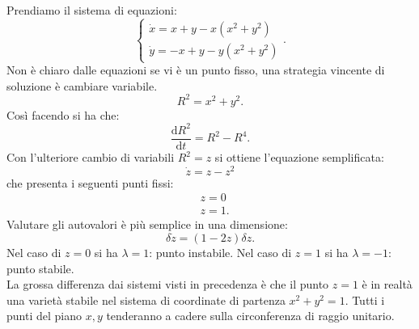 \noindent
\begin{exmp}
    Prendiamo il sistema di equazioni:
    \[
        \begin{cases}
	    \dot{x} = x + y - x (x^2+y^2) \\
	    \dot{y}=- x + y - y(x^2+ y^2) 
        \end{cases}
    .\] 
    Non è chiaro dalle equazioni se vi è un punto fisso, una strategia vincente di soluzione è cambiare variabile.
    \[
        R^2=x^2+y^2
    .\] 
    Così facendo si ha che:
    \[
        \frac{\text{d} R^2}{\text{d} t} = R^2-R^4
    .\] 
    Con l'ulteriore cambio di variabili $R^2 = z$ si ottiene l'equazione semplificata:
    \[
        \dot{z}=z-z^2
    \] 
    che presenta i seguenti punti fissi:
    \[\begin{aligned}
	& z = 0\\
	& z = 1
    .\end{aligned}\] 
    Valutare gli autovalori è più semplice in una dimensione:
    \[
	\delta\dot{z}=(1-2z) \delta z
    .\] 
    Nel caso di $z=0$ si ha $\lambda =1$: punto instabile. Nel caso di $z=1$ si ha $\lambda =-1$: punto stabile.\\
    La grossa differenza dai sistemi visti in precedenza è che il punto $z=1$ è in realtà una varietà stabile nel sistema di coordinate di partenza $x^2+y^2=1$.
    Tutti i punti del piano $x,y$ tenderanno a cadere sulla circonferenza di raggio unitario. 
\end{exmp}
\noindent
\clearpage
